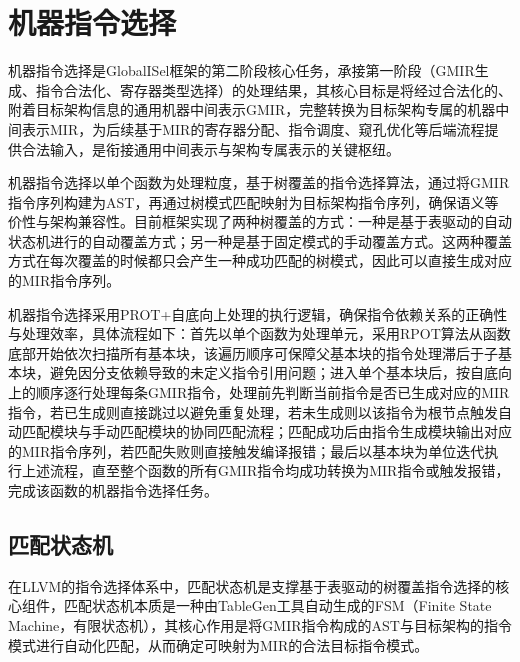 \section{机器指令选择}
机器指令选择是GlobalISel框架的第二阶段核心任务，承接第一阶段（GMIR生成、指令合法化、寄存器类型选择）的处理结果，其核心目标是将经过合法化的、附着目标架构信息的通用机器中间表示GMIR，完整转换为目标架构专属的机器中间表示MIR，为后续基于MIR的寄存器分配、指令调度、窥孔优化等后端流程提供合法输入，是衔接通用中间表示与架构专属表示的关键枢纽。

\par

机器指令选择以单个函数为处理粒度，基于树覆盖的指令选择算法，通过将GMIR指令序列构建为AST，再通过树模式匹配映射为目标架构指令序列，确保语义等价性与架构兼容性。目前框架实现了两种树覆盖的方式：一种是基于表驱动的自动状态机进行的自动覆盖方式；另一种是基于固定模式的手动覆盖方式。这两种覆盖方式在每次覆盖的时候都只会产生一种成功匹配的树模式，因此可以直接生成对应的MIR指令序列\cite{PengLLVM2024}。

\par

机器指令选择采用PROT+自底向上处理的执行逻辑，确保指令依赖关系的正确性与处理效率，具体流程如下：首先以单个函数为处理单元，采用RPOT算法从函数底部开始依次扫描所有基本块，该遍历顺序可保障父基本块的指令处理滞后于子基本块，避免因分支依赖导致的未定义指令引用问题；进入单个基本块后，按自底向上的顺序逐行处理每条GMIR指令，处理前先判断当前指令是否已生成对应的MIR指令，若已生成则直接跳过以避免重复处理，若未生成则以该指令为根节点触发自动匹配模块与手动匹配模块的协同匹配流程；匹配成功后由指令生成模块输出对应的MIR指令序列，若匹配失败则直接触发编译报错；最后以基本块为单位迭代执行上述流程，直至整个函数的所有GMIR指令均成功转换为MIR指令或触发报错，完成该函数的机器指令选择任务。


\subsection{匹配状态机}
在LLVM的指令选择体系中，匹配状态机是支撑基于表驱动的树覆盖指令选择的核心组件，匹配状态机本质是一种由TableGen工具自动生成的FSM（Finite State Machine，有限状态机），其核心作用是将GMIR指令构成的AST与目标架构的指令模式进行自动化匹配，从而确定可映射为MIR的合法目标指令模式。

\par

